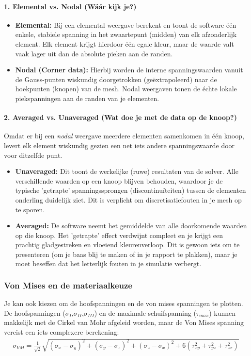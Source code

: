 \documentclass[a4paper,11pt,twoside]{report}
\begin{document}
\paragraph{1. Elemental vs. Nodal (Wáár kijk je?)}
\begin{itemize}
    \item \textbf{Elemental:} Bij een elemental weergave berekent en toont de software één enkele,
          stabiele spanning in het zwaartepunt (midden) van elk afzonderlijk element. Elk element krijgt
          hierdoor één egale kleur, maar de waarde valt vaak lager uit dan de absolute pieken aan de
          randen.
    \item \textbf{Nodal (Corner data):} Hierbij worden de interne spanningswaarden vanuit de
          Gauss-punten wiskundig doorgetrokken (geëxtrapoleerd) naar de hoekpunten (knopen) van de mesh.
          Nodal weergaven tonen de échte lokale piekspanningen aan de randen van je elementen.
\end{itemize}

\paragraph{2. Averaged vs. Unaveraged (Wat doe je met de data op de knoop?)}
Omdat er bij een \textit{nodal} weergave meerdere elementen samenkomen in één knoop, levert elk
element wiskundig gezien een net iets andere spanningswaarde door voor ditzelfde punt.
\begin{itemize}
    \item \textbf{Unaveraged:} Dit toont de werkelijke (ruwe) resultaten van de solver. Alle
          verschillende waarden op een knoop blijven behouden, waardoor je de typische 'getrapte'
          spanningssprongen (discontinuïteiten) tussen de elementen onderling duidelijk ziet. Dit is
          verplicht om discretisatiefouten in je mesh op te sporen.
    \item \textbf{Averaged:} De software neemt het gemiddelde van alle doorkomende waarden op die
          knoop. Het 'getrapte' effect verdwijnt compleet en je krijgt een prachtig gladgestreken en
          vloeiend kleurenverloop. Dit is gewoon iets om te presenteren (om je baas blij te maken of in je
          rapport te plakken), maar je moet beseffen dat het letterlijk fouten in je simulatie verbergt.
\end{itemize}
\subsubsection{Von Mises en de materiaalkeuze}
Je kan ook kiezen om de hoofspanningen en de von mises spanningen te plotten. De hoofspanningen
($\sigma_I$,$\sigma_{II}$,$\sigma_{III}$) en de maximale schuifspanning ($\tau_{max}$) kunnen
makkelijk met de Cirkel van Mohr afgeleid worden, maar de Von Mises spanning vereist een iets
complexere berekening:
\begin{align*}
    \sigma_{VM} = \frac{1}{\sqrt{2}} \sqrt{(\sigma_x - \sigma_y)^2 + (\sigma_y - \sigma_z)^2 + (\sigma_z - \sigma_x)^2 + 6(\tau_{xy}^2 + \tau_{yz}^2 + \tau_{zx}^2)}
\end{align*}
\end{document}
